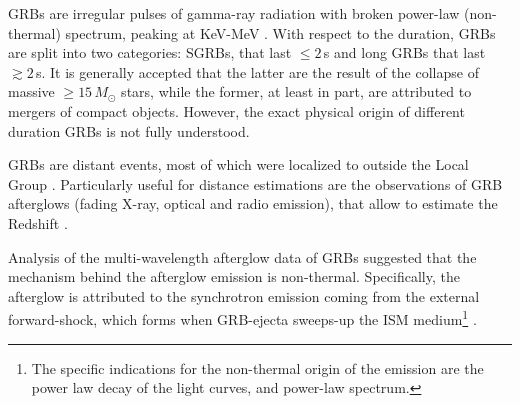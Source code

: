 \acp{GRB} are irregular pulses of gamma-ray radiation with broken power-law 
(non-thermal) spectrum, peaking at KeV-MeV \citep{Band:1993,Kouveliotou:1993,Meegan:1992xg}.
%
With respect to the duration, \acp{GRB} are split into two categories: \acp{SGRB}, 
that last ${\leq}2\,$s and long \acp{GRB} that last ${\gtrsim}2\,$s. 
%
It is generally accepted that the latter are the 
result of the collapse of massive ${\geq}15\,M_{\odot}$ stars,
 while the former, at least in part, are attributed to mergers of compact objects. 
%
However, the exact physical origin of different duration 
\acp{GRB} is not fully understood.
%

\acp{GRB} are distant events, most of which were localized to outside the Local Group 
\citep[\eg][]{Mao:1992,Piran:1992,Fenimore:1993}. 
%
Particularly useful for distance estimations are the observations of \ac{GRB} afterglows 
(fading X-ray, optical and radio emission), 
that allow to estimate the Redshift \citep[\eg][]{Costa:1997cg,Frontera:1997ae}.

Analysis of the multi-wavelength afterglow data of \acp{GRB} 
\citep[\eg][]{Panaitescu:2001bx} suggested that the mechanism behind the afterglow 
emission is non-thermal. Specifically, the afterglow is attributed to the 
synchrotron emission coming from the external forward-shock, which forms 
when \ac{GRB}-ejecta sweeps-up the \ac{ISM} medium\footnote{
    The specific indications for the non-thermal origin of the emission 
    are the power law decay of the light curves, and power-law spectrum. 
} 
\citep{Rees:1992ek,Paczynski:1993gz,Meszaros:1993ju,Meszaros:1996sv}.
%

